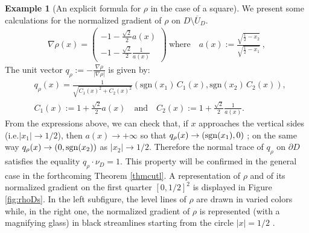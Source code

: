 \documentclass[reqno,11pt]{amsart}
\theoremstyle{definition}
\newtheorem{example}[theorem]{Example}
\numberwithin{equation}{section}
\def\ov{\overline}
\newcommand{\1}{{{\bf 1}\kern-0,28em\rm l}}
\begin{document}
\begin{example}[An explicit formula for $\rho$ in the case of a square]
We present  some calculations for the normalized gradient of $\rho$ on $D\setminus \ov U_D.$ 
\begin{align*}
\nabla \rho(x) = \left(
\begin{array}{c}
-1 - \frac{\sqrt{2}}{2} a(x)  \\
-1 - \frac{\sqrt{2}}{2} \frac{1}{a(x)}
\end{array} \right)\  \text{where}
\quad  a(x) := \frac{ \sqrt{\frac{1}{2}- x_2 }}{\sqrt{\frac{1}{2} - x_1 }}\ ,
\end{align*}
 The unit vector $q_\rho:=  - \frac{\nabla \rho}{|\nabla\rho|}$ is given by:
\begin{align*} &q_\rho(x)  = \frac{1}{\sqrt{C_1(x)^2 + C_2(x)^2}} \left( \text{sgn}(x_1)\, C_1(x),  \text{sgn}(x_2)\, C_2(x) \right) ,\\
&C_{1}(x) := 1 + \frac{\sqrt{2}}{2} a(x)  \quad \text{and} \quad C_{2}(x) :=  1 + \frac{\sqrt{2}}{2} \frac1{a(x)} .
\end{align*}
%
From the expressions above, we can check that, if $x$ approaches the vertical sides (i.e.$|x_1| \to 1/2$), then $a(x) \to +\infty$ so that 
 $q_\rho(x)\to ({\rm sgn}(x_1), 0)$ ; on the same way  $q_\rho(x)\to (0, {\rm sgn}(x_2))$ as $|x_2|\to 1/2$. Therefore the normal trace of $q_\rho$ on $\partial D$
 satisfies the equality  $q_\rho  \cdot \nu_D=1$. 
 This property will be confirmed in the general case in the forthcoming Theorem \ref{thmcutl}.
 A representation  of  $\rho$ and of its normalized gradient on the first quarter $[0,1/2]^2$ is displayed in Figure \ref{fig:rhoDs}.  In the left subfigure, the level lines of $\rho$ are drawn in varied colors while, in the right one,  the normalized gradient of $\rho$ is represented (with a magnifying glass)  in black streamlines  starting 
 from the circle $|x|=1/2$ .
\end{example}
\end{document}
